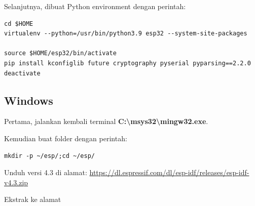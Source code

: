 \documentclass[12pt]{book}
\begin{document}
	Selanjutnya, dibuat Python environment dengan perintah:
	
	\begin{verbatim}
cd $HOME
virtualenv --python=/usr/bin/python3.9 esp32 --system-site-packages

source $HOME/esp32/bin/activate
pip install kconfiglib future cryptography pyserial pyparsing==2.2.0
deactivate
	\end{verbatim}
	
	\subsection{Windows}
	
	Pertama, jalankan kembali terminal \textbf{C:\textbackslash msys32\textbackslash mingw32.exe}.
	
	Kemudian buat folder dengan perintah:
	
	\begin{verbatim}
mkdir -p ~/esp/;cd ~/esp/
	\end{verbatim}
	
	Unduh versi 4.3 di alamat: \url{https://dl.espressif.com/dl/esp-idf/releases/esp-idf-v4.3.zip}
	
	Ekstrak ke alamat 
	
\end{document}

